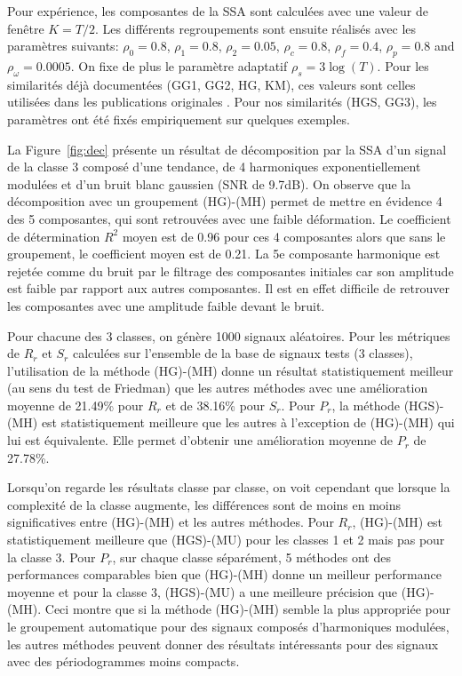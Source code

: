 \documentclass{gretsi}
\begin{document}
Pour expérience, les composantes de la SSA sont calculées avec une valeur de fenêtre $K=T/2$.
Les différents regroupements sont ensuite réalisés avec les paramètres suivants: $\rho_0=0.8$, $\rho_1=0.8$, $\rho_2=0.05$, $\rho_c=0.8$, $\rho_f=0.4$, $\rho_p=0.8$ and $\rho_\omega=0.0005$. On fixe de plus le paramètre adaptatif $\rho_s=3\log(T)$.
Pour les similarités déjà documentées (GG1, GG2, HG, KM), ces valeurs sont celles utilisées dans les publications originales \cite{abalov_14_auto, alvarez_13_auto}. Pour nos similarités (HGS, GG3), les paramètres ont été fixés empiriquement sur quelques exemples.


La Figure~\ref{fig:dec} présente un résultat de décomposition par la SSA d'un signal de la classe 3 composé d'une tendance, de 4 harmoniques exponentiellement modulées et d'un bruit blanc gaussien (SNR de 9.7dB).
On observe que la décomposition  avec un groupement (HG)-(MH) permet de mettre en évidence 4 des 5 composantes, qui sont retrouvées avec une faible déformation. 
Le coefficient de détermination $R^2$ moyen est de 0.96 pour ces 4 composantes alors que sans le groupement, le coefficient moyen est de 0.21.
La 5e composante harmonique est rejetée comme du bruit par le filtrage des composantes initiales car son amplitude est faible par rapport aux autres composantes.
Il est en effet difficile de retrouver les composantes avec une amplitude faible devant le bruit.


Pour chacune des 3 classes, on génère 1000 signaux aléatoires.
Pour les métriques de $R_r$ et $S_r$ calculées sur l'ensemble de la base de signaux tests (3 classes), l'utilisation de la méthode (HG)-(MH) donne un résultat statistiquement meilleur (au sens du test de Friedman) que les autres méthodes avec une amélioration moyenne de 21.49\% pour $R_r$ et de 38.16\% pour $S_r$.
Pour $P_r$, la méthode (HGS)-(MH) est statistiquement meilleure que les autres à l'exception de (HG)-(MH) qui lui est équivalente.
Elle permet d'obtenir une amélioration moyenne de $P_r$ de 27.78\%.


Lorsqu'on regarde les résultats classe par classe, on voit cependant que lorsque la complexité de la classe augmente, les différences sont de moins en moins significatives entre (HG)-(MH) et les autres méthodes.
Pour $R_r$, (HG)-(MH) est statistiquement meilleure que (HGS)-(MU) pour les classes 1 et 2 mais pas pour la classe 3.
Pour $P_r$, sur chaque classe séparément, 5 méthodes ont des performances comparables bien que (HG)-(MH) donne un meilleur performance moyenne et  pour la classe 3, (HGS)-(MU) a une meilleure précision que (HG)-(MH).
Ceci montre que si la méthode (HG)-(MH) semble la plus appropriée pour le groupement automatique pour des signaux composés d'harmoniques modulées, les autres méthodes peuvent donner des résultats intéressants pour des signaux avec des périodogrammes moins compacts.
\end{document}
